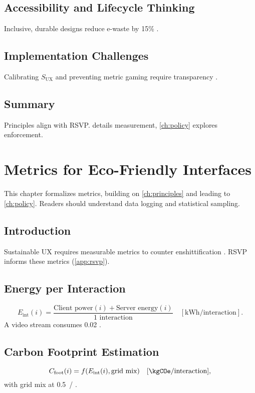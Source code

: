 \documentclass[openany]{book}
\newcommand{\Eint}{E_{\mathrm{int}}} %
\newcommand{\Cfoot}{C_{\mathrm{foot}}} %
\newcommand{\SUX}{S_{\mathrm{UX}}} %
\newcommand{\kWh}{\mathrm{kWh}}
\begin{document}
{\section{Accessibility and Lifecycle Thinking}
\label{sec:principles-accessibility}
Inclusive, durable designs reduce e-waste by 15\% \citep{designlab2024}.

\section{Implementation Challenges}
\label{sec:principles-challenges}
Calibrating \(\SUX\) and preventing metric gaming require transparency \citep{colak2024}.

\section{Summary}
Principles align with RSVP.  details measurement, \cref{ch:policy} explores enforcement.

\chapter{Metrics for Eco-Friendly Interfaces}
\label{ch:metrics}

This chapter formalizes metrics, building on \cref{ch:principles} and leading to \cref{ch:policy}. Readers should understand data logging and statistical sampling.

\section{Introduction}
\label{sec:metrics-intro}
Sustainable UX requires measurable metrics to counter enshittification \citep{prigogine1984,doctorow2022}. RSVP informs these metrics (\cref{app:rsvp}).

\section{Energy per Interaction}
\label{sec:metrics-energy}
\begin{equation}
\label{eq:Eint}
\Eint(i) = \frac{\text{Client power}(i) + \text{Server energy}(i)}{\text{1 interaction}} \quad [\kWh/\text{interaction}].
\end{equation}
A video stream consumes \SI{0.02}{\kWh} \citep{extentia2024}.

\section{Carbon Footprint Estimation}
\label{sec:metrics-carbon}
\begin{equation}
\label{eq:Cfoot}
\Cfoot(i) = f(\Eint(i), \text{grid mix}) \quad [\kgCOe/\text{interaction}],
\end{equation}
with grid mix at \SI{0.5}{\kgCOe/\kWh} \citep{colak2024}.

}
\end{document}
